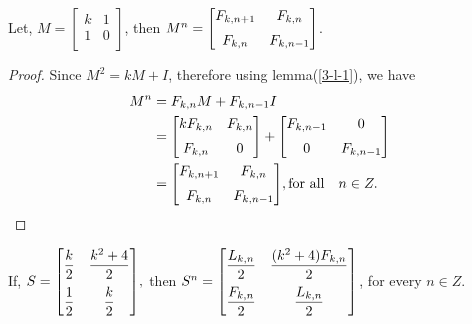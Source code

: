 \begin{corollary}
Let, $M={
 \begin{bmatrix}{}
    k & 1 \\
    1& 0 \\
	\end{bmatrix}
	}$,
	then $M^n={
 \begin{bmatrix}{}
    F_{k,n+1} & F_{k,n}\vspace{.2cm} \\
    F_{k,n} & F_{k,n-1} \\
	\end{bmatrix}
	}$.	
\end{corollary}
\begin{proof}
Since $M^2 = k M+I$, therefore using lemma(\ref{3-l-1}), we have
\begin{align*}
							M^n & = F_{k,n}M+F_{k,n-1}I\\
							 & = {
 \begin{bmatrix}{}
    kF_{k,n} & F_{k,n}\vspace{.2cm} \\
    F_{k,n} & 0 \\
	\end{bmatrix}
	}+{
 \begin{bmatrix}{}
    F_{k,n-1} & 0\vspace{.2cm} \\
    0 & F_{k,n-1} \\
	\end{bmatrix}
	}\\
		& = {
 \begin{bmatrix}{}
    F_{k,n+1} & F_{k,n}\vspace{.2cm} \\
    F_{k,n} & F_{k,n-1} \\
	\end{bmatrix}
	},\text{for all}\quad n\in Z.
\end{align*}
\end{proof}
\begin{corollary}
If, $S={
 \begin{bmatrix}{}
    \dfrac{k}{2} & \dfrac{k^2+4}{2} \vspace{.2cm}\\
    \dfrac{1}{2}& \dfrac{k}{2} \\
	\end{bmatrix}
	}, $
	then $S^n={
 \begin{bmatrix}{}
    \dfrac{L_{k,n}}{2} & \dfrac{(k^2+4)F_{k,n}}{2}\vspace{.2cm} \\
    \dfrac{F_{k,n}}{2} & \dfrac{L_{k,n}}{2} \\
	\end{bmatrix}
	}$, for every $n\in Z$.	
\end{corollary}
